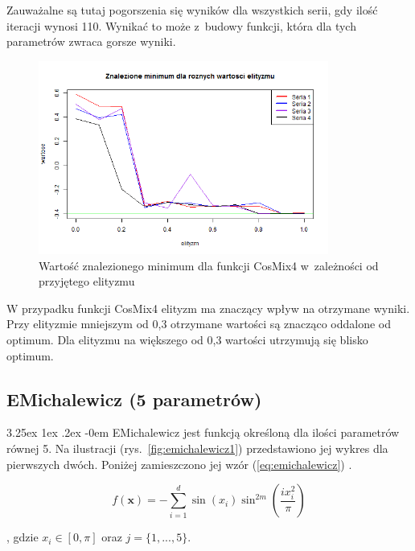 \documentclass[11pt, a4paper]{article}
\makeatletter
\newcommand{\fbi}{\leavevmode{\parindent=1em\indent}}
\renewcommand\paragraph{\@startsection{paragraph}{5}{\z@}
  {3.25ex \@plus1ex \@minus.2ex}
  {-0em}
  {\normalfont\normalsize\bfseries}}
\makeatother
\begin{document}
\fbi
Zauważalne są tutaj pogorszenia się wyników dla wszystkich serii, gdy ilość iteracji wynosi 110. Wynikać to może z~budowy funkcji, która dla tych parametrów zwraca gorsze wyniki.

\begin{figure}[H]
	\begin{center}
		\includegraphics[width=0.85\textwidth]{./assets/CosMix46.png}
		\caption{Wartość znalezionego minimum dla funkcji CosMix4 w~zależności od przyjętego elityzmu}
		\label{fig:cosmix46}
	\end{center}
\end{figure}

\fbi
W przypadku funkcji CosMix4 elityzm ma znaczący wpływ na otrzymane wyniki. Przy elityzmie mniejszym od 0,3 otrzymane wartości są znacząco oddalone od optimum. Dla elityzmu na większego od 0,3 wartości utrzymują się blisko optimum.

\newpage
\subsection{EMichalewicz (5 parametrów)}
\paragraph{}
EMichalewicz jest funkcją określoną dla ilości parametrów równej 5. Na ilustracji (rys.~\ref{fig:emichalewicz1}) przedstawiono jej wykres dla pierwszych dwóch. Poniżej zamieszczono jej wzór (\ref{eq:emichalewicz}) \cite{test4}.

\begin{equation}\label{eq:emichalewicz}
f(\boldsymbol{x}) = - \sum_{i=1}^{d} \sin(x_i) \sin^{2m} (\frac{i x_i^2}{\pi})
\end{equation}

, gdzie $ x_i \in [0, \pi]$ oraz $j = \{1, ..., 5\}$.
\end{document}
